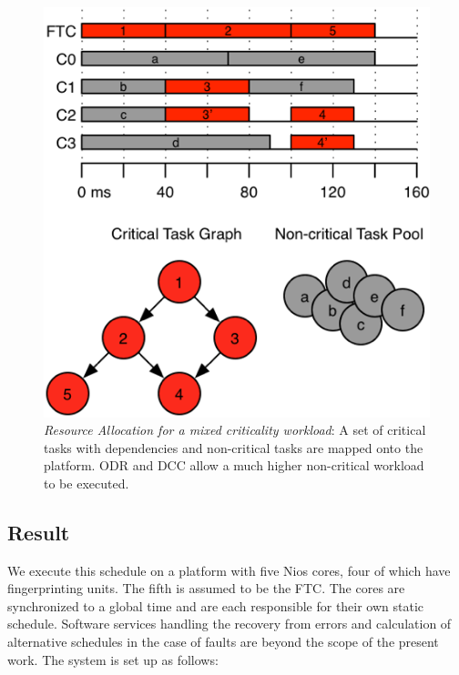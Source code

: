 \begin{figure}[ht]
\centering
\includegraphics[scale=0.8]{Figures/motiv_ex.png}
\caption[Resource Allocation for a mixed criticality workload] {\emph{Resource Allocation for a mixed criticality workload}: A set of critical tasks with dependencies and non-critical tasks are mapped onto the platform. ODR and DCC allow a much higher non-critical workload to be executed.}
\label{f:motiv_ex}
\end{figure}

\subsection{Result}
We execute this schedule on a platform with five Nios cores, four of which have fingerprinting units. The fifth is assumed to be the FTC. The cores are synchronized to a global time and are each responsible for their own static schedule. Software services handling the recovery from errors and calculation of alternative schedules in the case of faults are beyond the scope of the present work. The system is set up as follows:

